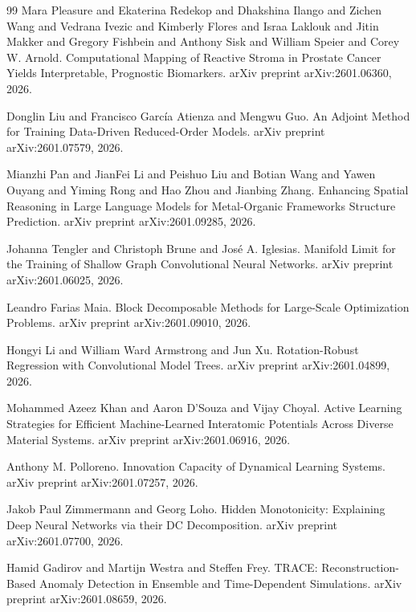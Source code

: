 \documentclass{article}
\begin{document}
\begin{thebibliography}{99}
Mara Pleasure and Ekaterina Redekop and Dhakshina Ilango and Zichen Wang and Vedrana Ivezic and Kimberly Flores and Israa Laklouk and Jitin Makker and Gregory Fishbein and Anthony Sisk and William Speier and Corey W. Arnold. Computational Mapping of Reactive Stroma in Prostate Cancer Yields Interpretable, Prognostic Biomarkers. arXiv preprint arXiv:2601.06360, 2026.

Donglin Liu and Francisco García Atienza and Mengwu Guo. An Adjoint Method for Training Data-Driven Reduced-Order Models. arXiv preprint arXiv:2601.07579, 2026.

Mianzhi Pan and JianFei Li and Peishuo Liu and Botian Wang and Yawen Ouyang and Yiming Rong and Hao Zhou and Jianbing Zhang. Enhancing Spatial Reasoning in Large Language Models for Metal-Organic Frameworks Structure Prediction. arXiv preprint arXiv:2601.09285, 2026.

Johanna Tengler and Christoph Brune and José A. Iglesias. Manifold Limit for the Training of Shallow Graph Convolutional Neural Networks. arXiv preprint arXiv:2601.06025, 2026.

Leandro Farias Maia. Block Decomposable Methods for Large-Scale Optimization Problems. arXiv preprint arXiv:2601.09010, 2026.

Hongyi Li and William Ward Armstrong and Jun Xu. Rotation-Robust Regression with Convolutional Model Trees. arXiv preprint arXiv:2601.04899, 2026.

Mohammed Azeez Khan and Aaron D'Souza and Vijay Choyal. Active Learning Strategies for Efficient Machine-Learned Interatomic Potentials Across Diverse Material Systems. arXiv preprint arXiv:2601.06916, 2026.

Anthony M. Polloreno. Innovation Capacity of Dynamical Learning Systems. arXiv preprint arXiv:2601.07257, 2026.

Jakob Paul Zimmermann and Georg Loho. Hidden Monotonicity: Explaining Deep Neural Networks via their DC Decomposition. arXiv preprint arXiv:2601.07700, 2026.

Hamid Gadirov and Martijn Westra and Steffen Frey. TRACE: Reconstruction-Based Anomaly Detection in Ensemble and Time-Dependent Simulations. arXiv preprint arXiv:2601.08659, 2026.


\end{thebibliography}
\end{document}
